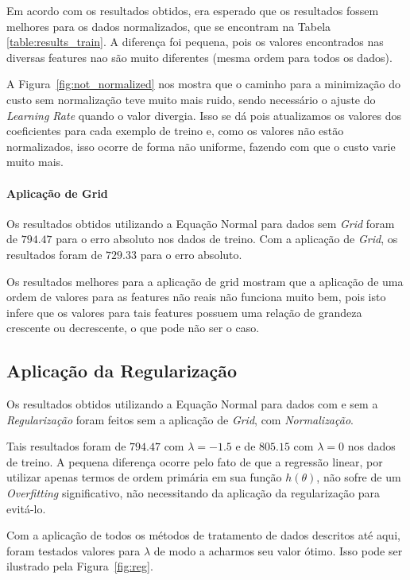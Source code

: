 \documentclass[conference]{IEEEtran}
\begin{document}
Em acordo com os resultados obtidos, era esperado que os resultados fossem melhores para os dados normalizados, que se encontram na Tabela \ref{table:results_train}. A diferença foi pequena, pois os valores encontrados nas diversas features nao são muito diferentes (mesma ordem para todos os dados).

A Figura~\ref{fig:not_normalized} nos mostra que o caminho para a minimização do custo sem normalização teve muito mais ruido, sendo necessário o ajuste do \textit{Learning Rate} quando o valor divergia. Isso se dá pois atualizamos os valores dos coeficientes para cada exemplo de treino e, como os valores não estão normalizados, isso ocorre de forma não uniforme, fazendo com que o custo varie muito mais.

\paragraph{Aplicação de Grid}

Os resultados obtidos utilizando a Equação Normal para dados sem \textit{Grid} foram de $794.47$ para o erro absoluto nos dados de treino. Com a aplicação de \textit{Grid}, os resultados foram de $729.33$ para o erro absoluto.

Os resultados melhores para a aplicação de grid mostram que a aplicação de uma ordem de valores para as features não reais não funciona muito bem, pois isto infere que os valores para tais features possuem uma relação de grandeza crescente ou decrescente, o que pode não ser o caso.

\subsection{Aplicação da Regularização}

Os resultados obtidos utilizando a Equação Normal para dados com e sem a \textit{Regularização} foram feitos sem a aplicação de \textit{Grid}, com \textit{Normalização}.

Tais resultados foram de $794.47$ com $\lambda = -1.5$ e de $805.15$ com $\lambda = 0$ nos dados de treino. A pequena diferença ocorre pelo fato de que a regressão linear, por utilizar apenas termos de ordem primária em sua função $h(\theta)$, não sofre de um \textit{Overfitting} significativo, não necessitando da aplicação da regularização para evitá-lo.

Com a aplicação de todos os métodos de tratamento de dados descritos até aqui, foram testados valores para $\lambda$ de modo a acharmos seu valor ótimo. Isso pode ser ilustrado pela Figura~\ref{fig:reg}.
\end{document}
